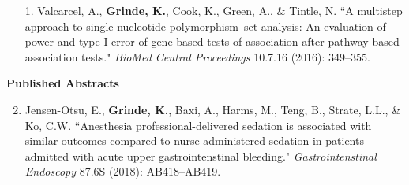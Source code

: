 \documentclass[margin]{res}
\newenvironment{benumerate}[1]{
    \let\oldItem\item
    \def\item{\addtocounter{enumi}{-2}\oldItem}
    
    \begin{enumerate}
    \setcounter{enumi}{#1}
    \addtocounter{enumi}{1}
}{
    \end{enumerate}
}
\begin{document}
\begin{resume}
\begin{itemize}
\item[1.] Valcarcel, A., \textbf{Grinde, K.}, Cook, K., Green, A., \& Tintle, N. ``A multistep approach to single nucleotide polymorphism--set analysis: An evaluation of power and type I error of gene-based tests of association after pathway-based association tests." \textit{BioMed Central Proceedings} 10.7.16 (2016): 349--355.  %

\end{itemize}
	
	
	
\textbf{Published Abstracts}
\begin{benumerate}{1}
\item Jensen-Otsu, E., \textbf{Grinde, K.}, Baxi, A., Harms, M., Teng, B., Strate, L.L., \& Ko, C.W. 
``Anesthesia professional-delivered sedation is associated with similar outcomes compared to nurse administered sedation in patients admitted with acute upper gastrointenstinal bleeding." \textit{Gastrointenstinal Endoscopy} 87.6S (2018):  AB418--AB419. %


\end{benumerate}
\end{resume}
\end{document}
